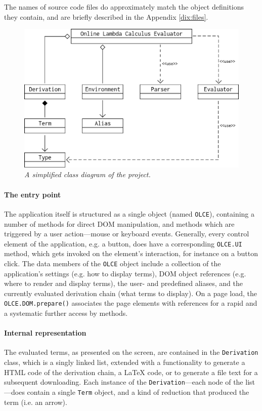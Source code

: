 \documentclass[table, a4paper, 10pt]{article}
\begin{document}
The names of source code files do approximately match the object definitions they contain,
and are briefly described in the Appendix \ref{dix:files}.

\begin{figure}[H]\centering
\includegraphics[scale=0.33]{simpleUMLpdf.pdf}
\caption{\textit{A simplified class diagram of the project.}}\label{uml}
\end{figure}

\paragraph{The entry point}
The application itself is structured as a single object (named \texttt{OLCE}), containing
a number of methods for direct DOM manipulation, and methods which are
triggered by a user action---mouse or keyboard events.
Generally, every control element of the application, e.g. a button, does have a corresponding
\texttt{OLCE.UI} method, which gets invoked on the element's interaction, for instance on a button click.
The data members of the \texttt{OLCE} object include a collection of the application's
settings (e.g. how to display terms), DOM object references (e.g. where to render and display terms),
the user- and predefined aliases, and the currently evaluated
derivation chain (what terms to display). On a page load, the \texttt{OLCE.DOM.prepare()} associates
the page elements with references for a rapid and a systematic further access by methods.

\paragraph{Internal representation}
The evaluated terms, as presented on the screen, are contained in
the \texttt{Derivation} class, which is a singly linked list,
extended with a functionality to generate a HTML code of the derivation chain,
a \LaTeX\; code, or to generate a file text for a subsequent downloading.
Each instance of the \texttt{Derivation}---each node of the list---does contain
a single \texttt{Term} object, and a kind of reduction that produced the term (i.e. an arrow).
\end{document}
